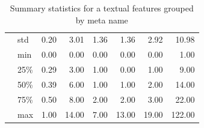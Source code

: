 \begin{table}[h]
\begin{center}
\begin{tabular}{llrrrrrr}
            & std &         0.20 &       3.01 &       1.36 &       1.36 &       2.92 &      10.98 \\
            & min &         0.00 &       0.00 &       0.00 &       0.00 &       0.00 &       1.00 \\
            & 25\% &         0.29 &       3.00 &       1.00 &       0.00 &       1.00 &       9.00 \\
            & 50\% &         0.39 &       6.00 &       1.00 &       1.00 &       2.00 &      14.00 \\
            & 75\% &         0.50 &       8.00 &       2.00 &       2.00 &       3.00 &      22.00 \\
            & max &         1.00 &      14.00 &       7.00 &      13.00 &      19.00 &     122.00 \\
\bottomrule
\end{tabular}

\caption{Summary statistics for a textual features grouped by meta name}
\label{table:textualDistr}
\end{center}
\end{table}      



